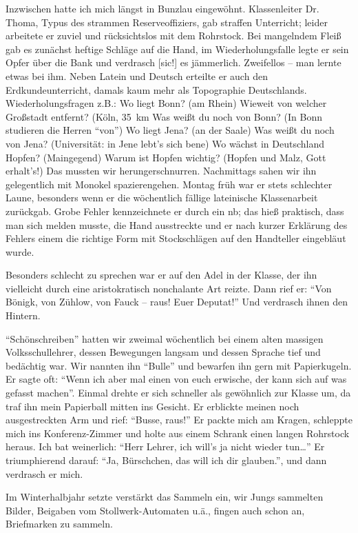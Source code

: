 \documentclass[a5paper,pagesize,10pt,twoside=true]{scrbook}
\begin{document}
Inzwischen hatte ich mich längst in Bunzlau eingewöhnt. Klassenleiter Dr. Thoma, Typus des strammen Reserveoffiziers, gab straffen Unterricht; leider arbeitete er zuviel und rücksichtslos mit dem Rohrstock. Bei mangelndem Fleiß gab es zunächst heftige Schläge auf die Hand, im Wiederholungsfalle legte er sein Opfer über die Bank und verdrasch [sic!] es jämmerlich. Zweifellos -- man lernte etwas bei ihm. Neben Latein und Deutsch erteilte er auch den Erdkundeunterricht, damals kaum mehr als Topographie Deutschlands. Wiederholungsfragen z.B.: Wo liegt Bonn? (am Rhein) Wieweit von welcher Großstadt entfernt? (Köln, 35~km Was weißt du noch von Bonn? (In Bonn studieren die Herren \enquote{von}) Wo liegt Jena? (an der Saale) Was weißt du noch von Jena? (Universität: in Jene lebt's sich bene) Wo wächst in Deutschland Hopfen? (Maingegend) Warum ist Hopfen wichtig? (Hopfen und Malz, Gott erhalt's!) Das mussten wir herungerschnurren. Nachmittags sahen wir ihn gelegentlich mit Monokel spazierengehen. Montag früh war er stets schlechter Laune, besonders wenn er die wöchentlich fällige lateinische Klassenarbeit zurückgab. Grobe Fehler kennzeichnete er durch ein nb; das hieß praktisch, dass man sich melden musste, die Hand ausstreckte und er nach kurzer Erklärung des Fehlers einem die richtige Form mit Stockschlägen auf den Handteller eingebläut wurde.

Besonders schlecht zu sprechen war er auf den Adel in der Klasse, der ihn vielleicht durch eine aristokratisch nonchalante Art reizte. Dann rief er: \enquote{Von Bönigk, von Zühlow, von Fauck -- raus! Euer Deputat!} Und verdrasch ihnen den Hintern.

\enquote{Schönschreiben} hatten wir zweimal wöchentlich bei einem alten massigen Volksschullehrer, dessen Bewegungen langsam und dessen Sprache tief und bedächtig war. Wir nannten ihn \enquote{Bulle} und bewarfen ihn gern mit Papierkugeln. Er sagte oft: \enquote{Wenn ich aber mal einen von euch erwische, der kann sich auf was gefasst machen}. Einmal drehte er sich schneller als gewöhnlich zur Klasse um, da traf ihn mein Papierball mitten ins Gesicht. Er erblickte meinen noch ausgestreckten Arm und rief: \enquote{Busse, raus!} Er packte mich am Kragen, schleppte mich ins Konferenz-Zimmer und holte aus einem Schrank einen langen Rohrstock heraus. Ich bat weinerlich: \enquote{Herr Lehrer, ich will's ja nicht wieder tun\dots} Er triumphierend darauf: \enquote{Ja, Bürschchen, das will ich dir glauben.}, und dann verdrasch er mich.

Im Winterhalbjahr setzte verstärkt das Sammeln ein, wir Jungs sammelten Bilder, Beigaben vom Stollwerk-Automaten u.ä., fingen auch schon an, Briefmarken zu sammeln.
\end{document}
